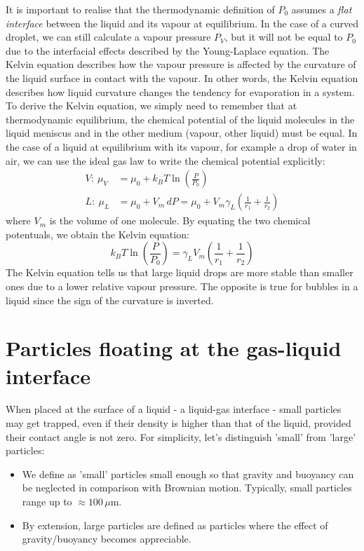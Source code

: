 \documentclass[a4paper, 11pt, normalem]{report}
\begin{document}
It  is  important  to  realise  that  the  thermodynamic  definition  of $P_0$ assumes a \textit{flat interface} between the liquid and its vapour at equilibrium.
In the case of a curved droplet, we can still calculate a vapour pressure $P_V$, but it will not be equal to $P_0$ due to the interfacial effects described by the Young-Laplace equation.
The Kelvin equation describes how the vapour pressure is affected by the curvature of the liquid surface in contact with the vapour.
In other words, the Kelvin equation describes how liquid curvature changes the tendency for evaporation in a system.
To derive the Kelvin equation, we simply need to remember that at thermodynamic equilibrium, the chemical potential of the liquid molecules in the liquid meniscus and in the other medium (vapour, other liquid) must be equal.
In the case of a liquid at equilibrium with its vapour, for example a drop of water in air, we can use the ideal gas law to write the chemical potential explicitly:
\begin{align}
    V:~ \mu_V &= \mu_0 + k_BT\ln\left(\frac{P}{P_0}\right) \\
    L:~ \mu_L &= \mu_0 + V_m\,dP = \mu_0 + V_m\gamma_L\left(\frac{1}{r_1} + \frac{1}{r_2}\right)
\end{align}
where $V_m$ is the volume of one molecule.
By equating the two chemical potentuals, we obtain the Kelvin equation:
\begin{equation}
    k_BT\ln\left(\frac{P}{P_0}\right) = \gamma_LV_m\left(\frac{1}{r_1} + \frac{1}{r_2}\right)
\end{equation}
The Kelvin equation tells us that large liquid drops are more stable than smaller ones due to a lower relative vapour pressure.
The opposite is true for bubbles in a liquid since the sign of the curvature is inverted.

\section{Particles floating at the gas-liquid interface}
When placed at the surface of a liquid - a liquid-gas interface - small particles may get trapped, even if their density is higher than that of the liquid, provided their contact angle is not zero.
For simplicity, let's distinguish 'small' from 'large' particles:
\begin{itemize}
    \item We define as 'small' particles small enough so that gravity and buoyancy can be neglected in comparison with Brownian motion.
        Typically, small particles range up to $\approx 100\,\mu$m.
    \item By extension, large particles are defined as particles where the effect of gravity/buoyancy becomes appreciable.
\end{itemize}
\end{document}
